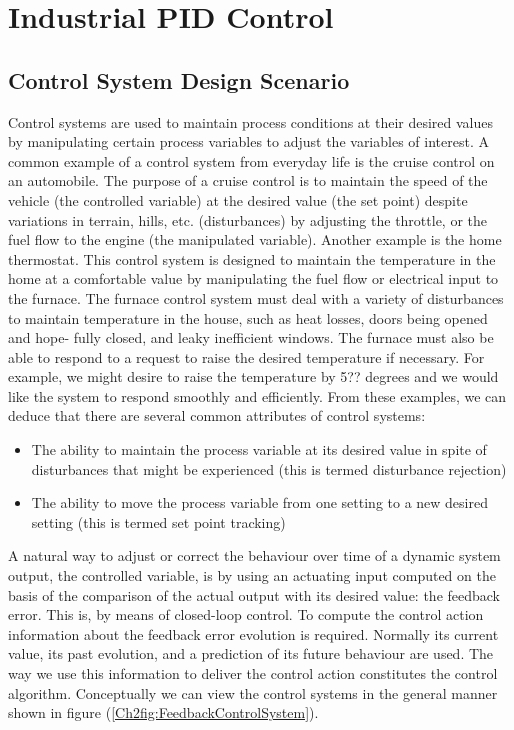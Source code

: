 \chapter{Industrial PID Control}
\label{chap:IndustrialPID}


\section{Control System Design Scenario}
\label{sec:1}

Control systems are used to maintain process conditions at their desired values by manipulating certain process variables to adjust the variables of interest. A common example of a control system from everyday life is the cruise control on an automobile. The purpose of a cruise control is to maintain the speed of the vehicle (the controlled variable) at the desired value (the set point) despite variations in terrain, hills, etc. (disturbances) by adjusting the throttle, or the fuel flow to the engine (the manipulated variable). Another example is the home thermostat. This control system is designed to maintain the temperature in the home at a comfortable value by manipulating the fuel flow or electrical input to the furnace. The furnace control system must deal with a variety of disturbances to maintain temperature in the house, such as heat losses, doors being opened and hope- fully closed, and leaky inefficient windows. The furnace must also be able to respond to a request to raise the desired temperature if necessary. For example, we might desire to raise the temperature by 5?? degrees and we would like the system to respond smoothly and efficiently. From these examples, we can deduce that there are several common attributes of control systems:
\begin{itemize}
\item The ability to maintain the process variable at its desired value in spite of disturbances that might be experienced (this is termed disturbance rejection)
\item The ability to move the process variable from one setting to a new desired setting (this is termed set point tracking)
\end{itemize}

A natural way to adjust or correct the behaviour over time of a dynamic system output, the controlled variable, is by using an actuating input computed on the basis of the comparison of the actual output with its desired value: the feedback error. This is, by means of closed-loop control. To compute the control action information about the feedback error evolution is required. Normally its current value, its past evolution, and a prediction of its future behaviour are used. The way we use this information to deliver the control action constitutes the control algorithm. Conceptually we can view the control systems in the general manner shown in figure (\ref{Ch2fig:FeedbackControlSystem}).

